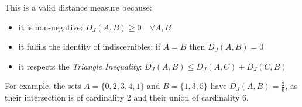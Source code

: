This is a valid distance measure because:
\begin{itemize}
  \item it is non-negative: $D_J(A,B) \geq 0 \quad \forall A, B$
  \item it fulfils the identity of indiscernibles: if $A = B$ then $D_J(A,B)=0$
  \item it respects the \textit{Triangle Inequality}: $D_J(A,B) \leq D_J(A,C) + D_J(C,B) $
\end{itemize}

For example, the sets $A = \{ 0, 2, 3, 4, 1 \}$ and $B = \{ 1, 3, 5 \}$ have $D_J(A,B) = \frac{2}{6}$, as their intersection is of cardinality 2 and their union of cardinality 6.
